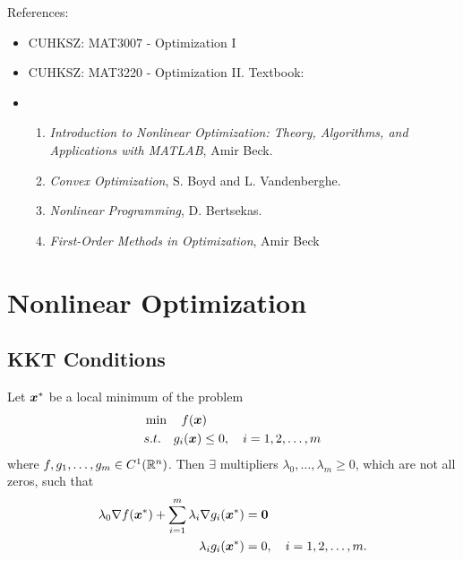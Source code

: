 \documentclass[10pt,a4paper]{article}
\begin{document}
	\MakeScribeTop
	\tableofcontents


References: 
\begin{itemize}
	\item CUHKSZ: MAT3007 - Optimization I
	\item CUHKSZ: MAT3220 - Optimization II. Textbook: 
	\item \begin{enumerate}
		\item \textit{Introduction to Nonlinear Optimization: Theory, Algorithms, and
		Applications with MATLAB}, Amir Beck.
		\item \textit{Convex Optimization}, S. Boyd and L. Vandenberghe.
		\item \textit{Nonlinear Programming}, D. Bertsekas.
		\item \textit{First-Order Methods in Optimization}, Amir Beck
	\end{enumerate}
	
	
\end{itemize}

\section{Nonlinear Optimization}\label{sec:nonlinearOPT}
\subsection{KKT Conditions}\label{sec:KKT}
\begin{thmbox}
	\begin{theorem}\label{thm:KKT-FJnecessary}
		Let ${\boldsymbol x}^*$ be a local minimum of the problem
		\begin{align*}
		&\min\quad f({\boldsymbol x})\\
		&s.t.\quad g_i({\boldsymbol x})\leq0,\quad i=1,2,\ldots,m
		\end{align*}
		where $f,g_1,\ldots,g_m\in C^1(\mathbb R^n)$. Then $\exists$ multipliers $\lambda_0,\ldots,\lambda_m\geq 0$, which are not all zeros, such that  
		\begin{align*}
			\lambda_0\nabla f({\boldsymbol x}^*)+\sum_{i=1}^m\lambda_i\nabla g_i({\boldsymbol x}^*)& ={\boldsymbol 0} \\
			\lambda_ig_i({\boldsymbol x}^*)& =0, \quad i=1,2,\ldots,m.
		\end{align*} 
	\end{theorem}	
\end{thmbox}
\end{document}
